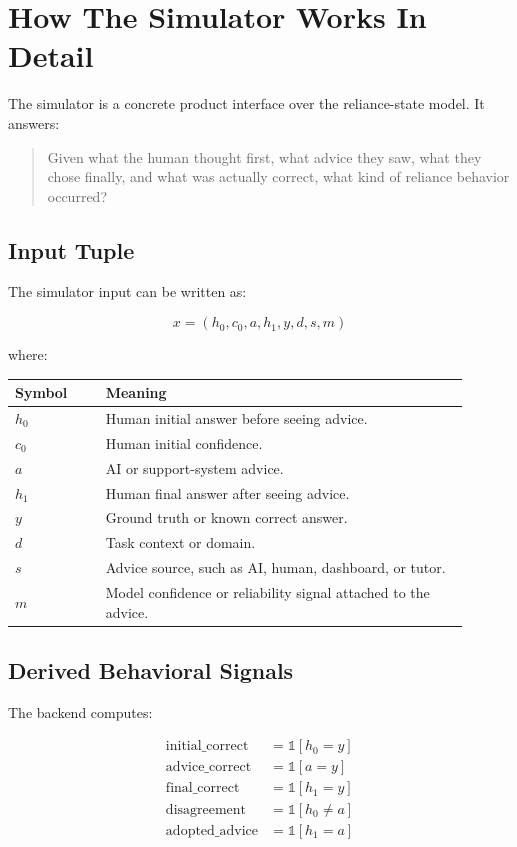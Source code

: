 \documentclass[11pt]{article}
\begin{document}
\section{How The Simulator Works In Detail}

The simulator is a concrete product interface over the reliance-state model. It answers:

\begin{quote}
Given what the human thought first, what advice they saw, what they chose finally, and what was actually correct, what kind of reliance behavior occurred?
\end{quote}

\subsection{Input Tuple}

The simulator input can be written as:

\[
x = (h_0, c_0, a, h_1, y, d, s, m)
\]

where:

\begin{longtable}{p{0.18\linewidth} p{0.72\linewidth}}
\toprule
\textbf{Symbol} & \textbf{Meaning} \\
\midrule
$h_0$ & Human initial answer before seeing advice. \\
$c_0$ & Human initial confidence. \\
$a$ & AI or support-system advice. \\
$h_1$ & Human final answer after seeing advice. \\
$y$ & Ground truth or known correct answer. \\
$d$ & Task context or domain. \\
$s$ & Advice source, such as AI, human, dashboard, or tutor. \\
$m$ & Model confidence or reliability signal attached to the advice. \\
\bottomrule
\end{longtable}

\subsection{Derived Behavioral Signals}

The backend computes:

\begin{align*}
\text{initial\_correct} &= \mathbb{1}[h_0 = y] \\
\text{advice\_correct} &= \mathbb{1}[a = y] \\
\text{final\_correct} &= \mathbb{1}[h_1 = y] \\
\text{disagreement} &= \mathbb{1}[h_0 \ne a] \\
\text{adopted\_advice} &= \mathbb{1}[h_1 = a]
\end{align*}
\end{document}
